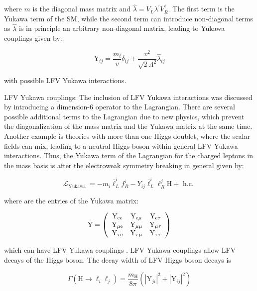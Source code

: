 where $m$ is the diagonal mass matrix and $\hat{\lambda}=V_{L} \lambda^{\prime} V_{R}^{\dagger}$. The first term is the Yukawa term of the SM, while the second term can introduce non-diagonal terms as $\hat{\lambda}$ is in principle an arbitrary non-diagonal matrix, leading to Yukawa couplings \Yij given by:

\begin{equation}
  \mathrm{Y}_{i j}=\frac{m_{i}}{v} \delta_{i j}+\frac{v^2}{\sqrt{2} \Lambda^2} \hat{\lambda}_{i j}
\end{equation}

with possible LFV Yukawa interactions.

LFV Yukawa couplings: The inclusion of LFV Yukawa interactions was discussed by introducing a dimension-6 operator to the Lagrangian. There are several possible additional terms to the Lagrangian due to new physics, which prevent the diagonalization of the mass matrix and the Yukawa matrix at the same time. Another example is theories with more than one Higgs doublet, where the scalar fields can mix, leading to a neutral Higgs boson within general LFV Yukawa interactions. Thus, the Yukawa term of the Lagrangian for the charged leptons in the mass basis is after the electroweak symmetry breaking in general given by:

\begin{equation}
  \mathcal{L}_{\text {Yukawa }}=-m_{i} \bar{\ell}_{L}^{i} f_{R}^{i}-Y_{i j} \bar{\ell}_{L}^{i} \ell_{R}^{j} \mathrm{H}+\text { h.c. }
\end{equation}

where \Yij are the entries of the Yukawa matrix:

\begin{equation}
  \mathrm{Y}=\left(\begin{array}{ccc}
  \text{Y}_{\text{e}\text{e}} & \text{Y}_{\text{e}\mu} & \text{Y}_{\text{e}\tau} \\
  \text{Y}_{\mu\text{e}} & \text{Y}_{\mu\mu} & \text{Y}_{\mu\tau} \\
  \text{Y}_{\tau\text{e}} & \text{Y}_{\tau\mu} & \text{Y}_{\tau\tau}
  \end{array}\right)
\end{equation}

which can have LFV Yukawa couplings \Yij. LFV Yukawa couplings allow LFV decays of the Higgs boson. The decay width of LFV Higgs boson decays is

\begin{equation}
  \Gamma(\mathrm{H} \to \ell_{i} \ell_{j})=\frac{m_{\mathrm{H}}}{8 \pi}(|\mathrm{Y}_{j i}|^2+|\mathrm{Y}_{i j}|^2)
\end{equation}

